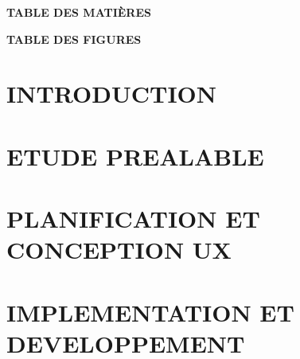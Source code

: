 \documentclass[12pt,a4paper,final]{report}
\begin{document}
\newpage
\thispagestyle{empty}
\begin{center}
    \vspace*{1cm}
    \Huge{\textbf{TABLE DES MATIÈRES}}
    \vspace{1.5cm}
\end{center}
\renewcommand{\contentsname}{}
\tableofcontents
\thispagestyle{empty}
\newpage

\thispagestyle{empty}
\begin{center}
    \vspace*{1cm}
    \Huge{\textbf{TABLE DES FIGURES}}
    \vspace{1.5cm}
\end{center}
\renewcommand{\listfigurename}{}
\listoffigures
{}
\thispagestyle{empty}
\newpage

\chapter*{INTRODUCTION}


\chapter{ETUDE PREALABLE}


\chapter{PLANIFICATION ET CONCEPTION UX}


\chapter{IMPLEMENTATION ET DEVELOPPEMENT}



\end{document}
